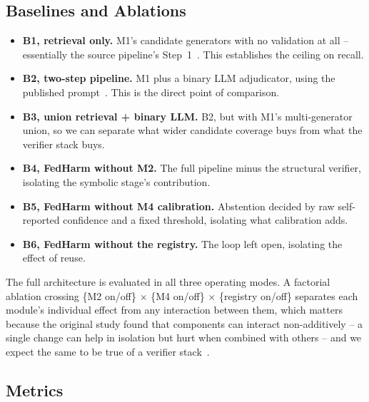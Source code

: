 \documentclass[conference]{IEEEtran}
\begin{document}
\subsection{Baselines and Ablations}

\begin{itemize}
\item \textbf{B1, retrieval only.} M1's candidate generators with no validation at all -- essentially the source pipeline's Step~1~\cite{b1}. This establishes the ceiling on recall.
\item \textbf{B2, two-step pipeline.} M1 plus a binary LLM adjudicator, using the published prompt~\cite{b1}. This is the direct point of comparison.
\item \textbf{B3, union retrieval + binary LLM.} B2, but with M1's multi-generator union, so we can separate what wider candidate coverage buys from what the verifier stack buys.
\item \textbf{B4, FedHarm without M2.} The full pipeline minus the structural verifier, isolating the symbolic stage's contribution.
\item \textbf{B5, FedHarm without M4 calibration.} Abstention decided by raw self-reported confidence and a fixed threshold, isolating what calibration adds.
\item \textbf{B6, FedHarm without the registry.} The loop left open, isolating the effect of reuse.
\end{itemize}
The full architecture is evaluated in all three operating modes. A factorial ablation crossing \{M2 on/off\} $\times$ \{M4 on/off\} $\times$ \{registry on/off\} separates each module's individual effect from any interaction between them, which matters because the original study found that components can interact non-additively -- a single change can help in isolation but hurt when combined with others -- and we expect the same to be true of a verifier stack~\cite{b1}.

\subsection{Metrics}
\end{document}
